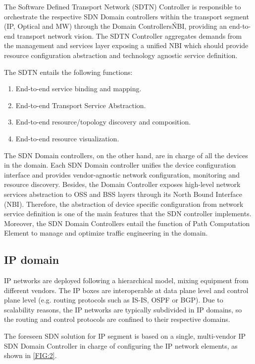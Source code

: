 \documentclass[a4paper,fleqn]{cas-dc}
\begin{document}
The Software Defined Transport Network (SDTN) Controller is responsible to orchestrate the respective SDN Domain controllers within the transport segment (IP, Optical and MW) through the Domain Controllers\'NBI, providing an end-to-end transport network vision. The SDTN Controller aggregates demands from the management and services layer exposing a unified NBI which should provide resource configuration abstraction and technology agnostic service definition. 

The SDTN entails the following functions: 
\begin{enumerate}
    \item End-to-end service binding and mapping.
    \item End-to-end Transport Service Abstraction.
    \item End-to-end resource/topology discovery and composition.
    \item End-to-end resource visualization.
\end{enumerate}

The SDN Domain controllers, on the other hand, are in charge of all the devices in the domain. Each SDN Domain controller unifies the device configuration interface and provides vendor-agnostic network configuration, monitoring and resource discovery. Besides, the Domain Controller exposes high-level network services abstraction to OSS and BSS layers through its North Bound Interface (NBI). Therefore, the abstraction of device specific configuration from network service definition is one of the main features that the SDN controller implements. Moreover, the SDN Domain Controllers entail the function of Path Computation Element to manage and optimize traffic engineering in the domain.

\subsection {IP domain}
\label{section:ip}
IP networks are deployed following a hierarchical model, mixing equipment from different vendors. The IP boxes are interoperable at data plane level and control plane level (e.g. routing protocols such as IS-IS, OSPF or BGP). Due to scalability reasons, the IP networks are typically subdivided in IP domains, so the routing and control protocols are confined to their respective domains.

The foreseen SDN solution for IP segment is based on a single, multi-vendor IP SDN Domain Controller in charge of configuring the IP network elements, as shown in \ref{FIG:2}.
\end{document}

